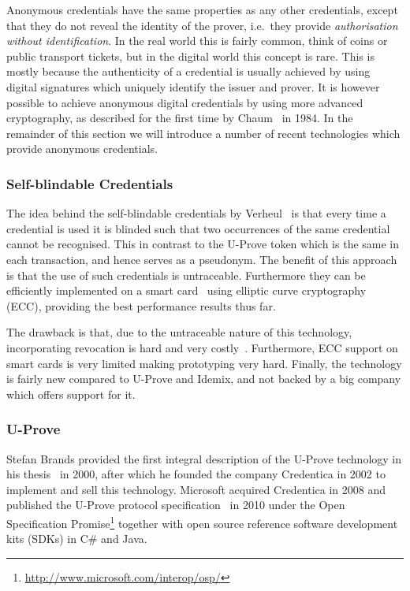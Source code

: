 Anonymous credentials have the same properties as any other credentials,
except that they do not reveal the identity of the prover, i.e.\ they provide
\emph{authorisation without identification}. In the real world this is
fairly common, think of coins or public transport tickets, but in the
digital world this concept is rare. This is mostly because the
authenticity of a credential is usually achieved by using digital
signatures which uniquely identify the issuer and prover. It is however
possible to achieve anonymous digital credentials by using more advanced
cryptography, as described for the first time by Chaum~\cite{Chaum1985} in
1984. In the remainder of this section we will introduce a number of recent
technologies which provide anonymous credentials.

\subsubsection{Self-blindable Credentials}\label{sec:selfblindable}

The idea behind the self-blindable credentials by
Verheul~\cite{Verheul01} is that every time a credential is used it is
blinded such that two occurrences of the same credential cannot be
recognised. This in contrast to the U-Prove token which is the same in
each transaction, and hence serves as a pseudonym. The benefit of this
approach is that the use of such credentials is
untraceable. Furthermore they can be efficiently implemented on a
smart card~\cite{BatinaHJMV10,HoepmanJV10} using elliptic curve
cryptography (ECC), providing the best performance results thus far.

The drawback is that, due to the untraceable nature of this technology,
incorporating revocation is hard and very costly~\cite{HoepmanLV11}.
Furthermore, ECC support on smart cards is very limited making prototyping
very hard. Finally, the technology is fairly new compared to U-Prove and
Idemix, and not backed by a big company which offers support for it.

\subsubsection{U-Prove}\label{sec:uprove}

Stefan Brands provided the first integral description of the U-Prove
technology in his thesis~\cite{Brands2000} in 2000, after which he founded
the company Credentica in 2002 to implement and sell this technology.
Microsoft acquired Credentica in 2008 and published the U-Prove protocol
specification~\cite{U-Prove_Crypto2010} in 2010 under the Open
Specification
Promise\footnote{\url{http://www.microsoft.com/interop/osp/}} together with
open source reference software development kits (SDKs) in C\# and Java.


